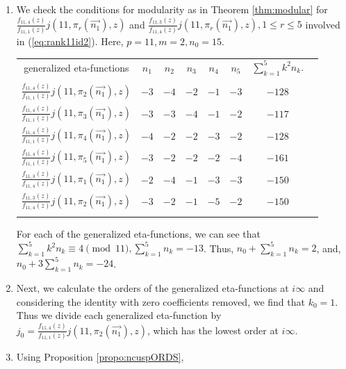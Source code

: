 \documentclass[12pt]{amsart}
\theoremstyle{definition}
\theoremstyle{remark}
\numberwithin{equation}{section}
\newcommand\thm[1]{\ref{thm:#1}}
\newcommand\propo[1]{\ref{propo:#1}}
\newcommand\eqn[1]{(\ref{eq:#1})}
\begin{document}
\begin{enumerate}
\item[Step 1] We check the conditions for modularity as in Theorem \thm{modular} for $\frac{f_{11,4}(z)}{f_{11,1}(z)}j(11,\pi_r(\overrightarrow{n_1}),z)$ and $\frac{f_{11,3}(z)}{f_{11,4}(z)}j(11,\pi_r(\overrightarrow{n_1}),z), 1\leq r \leq 5$ involved in \eqn{rank11id2}. Here, $p=11, m=2, n_0=15$. 
\\
\begin{center}
\begin{tabular}{c c c c c c c c}
generalized eta-functions & $n_1$ & $n_2$ & $n_3$ & $n_4$ & $n_5$ &  $\displaystyle \sum_{k=1}^{5}k^2 n_k$.  \\\\
$\frac{f_{11,4}(z)}{f_{11,1}(z)}j(11,\pi_2(\overrightarrow{n_1}),z)$   & $-3$   &  $-4$   &  $-2$  &  $-1$  &  $-3$  &  $-128$ \\
$\frac{f_{11,4}(z)}{f_{11,1}(z)}j(11,\pi_3(\overrightarrow{n_1}),z)$   & $-3$   &  $-3$   &  $-4$  &  $-1$  &  $-2$  &  $-117$ \\
$\frac{f_{11,4}(z)}{f_{11,1}(z)}j(11,\pi_4(\overrightarrow{n_1}),z)$   & $-4$   &  $-2$   &  $-2$  &  $-3$  &  $-2$  &  $-128$ \\
$\frac{f_{11,4}(z)}{f_{11,1}(z)}j(11,\pi_5(\overrightarrow{n_1}),z)$   & $-3$   &  $-2$   &  $-2$  &  $-2$  &  $-4$  &  $-161$ \\ 
$\frac{f_{11,3}(z)}{f_{11,4}(z)}j(11,\pi_1(\overrightarrow{n_1}),z)$   & $-2$  &  $-4$   &  $-1$  &  $-3$  &  $-3$   &  $-150$ \\ 
$\frac{f_{11,3}(z)}{f_{11,4}(z)}j(11,\pi_2(\overrightarrow{n_1}),z)$   & $-3$  &  $-2$   &  $-1$  &  $-5$  &  $-2$   &  $-150$\\\\
\end{tabular} 
\end{center} 
For each of the generalized eta-functions, we can see that $\displaystyle \sum_{k=1}^{5}k^2 n_k\equiv 4 \pmod {11}, \displaystyle \sum_{k=1}^{5}n_k=-13$. Thus, $n_0+\displaystyle \sum_{k=1}^{5}n_k=2$, and, $n_0+3 \displaystyle \sum_{k=1}^{5}n_k = -24$.
\item[Step 2] Next, we calculate the orders of the generalized eta-functions at $i\infty$ and considering the identity with zero coefficients removed, we find that $k_0=1$. Thus we divide each generalized eta-function by $j_0=\frac{f_{11,4}(z)}{f_{11,1}(z)}j(11,\pi_2(\overrightarrow{n_1}),z)$, which has the lowest order at $i\infty$. 
\item[Step 3] Using Proposition \propo{ncuspORDS},

\end{enumerate}
\end{document}
